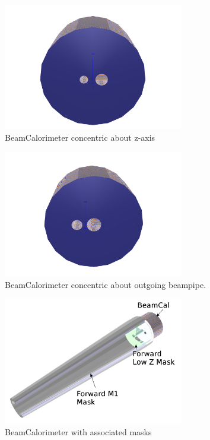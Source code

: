 \documentclass{report}
\begin{document}
            \begin{figure}[h] 
                \includegraphics[width=0.7\textwidth]{beamcal_zaxis}
                \centering
                \caption{BeamCalorimeter concentric about z-axis}
                \label{fig:beamcal_zaxis}
            \end{figure}
            \begin{figure}[H] 
                \includegraphics[width=0.7\textwidth]{beamcal_aligned}
                \centering
                \caption{BeamCalorimeter concentric about outgoing beampipe.}
                \label{fig:beamcal_aligned}
            \end{figure}
            \begin{figure}[H] 
                \includegraphics[width=0.7\textwidth]{beamcal_masks}
                \centering
                \caption{BeamCalorimeter with associated masks}
                \label{fig:beamcal_masks}
            \end{figure}
\end{document}
